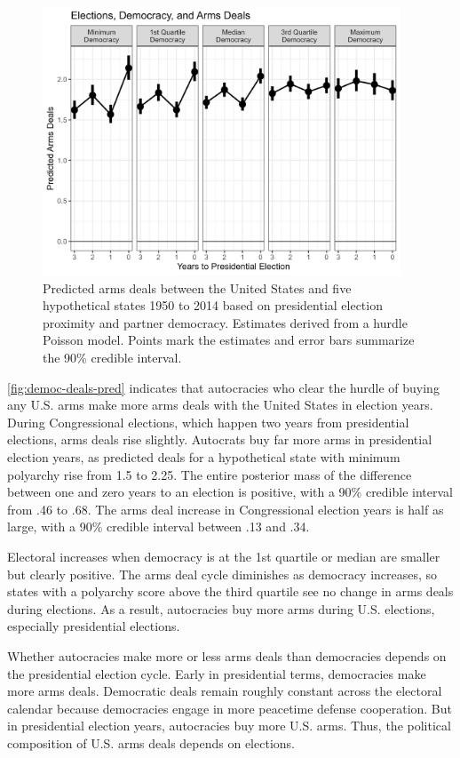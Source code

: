\documentclass[12pt]{article}
\begin{document}
\begin{figure}[htpb]
	\centering
		\includegraphics[width=0.95\textwidth]{../figures/democ-deals-pred.png}
	\caption{Predicted arms deals between the United States and five hypothetical states 1950 to 2014 based on presidential election proximity and partner democracy. Estimates derived from a hurdle Poisson model. Points mark the estimates and error bars summarize the 90\% credible interval.}
	\label{fig:democ-deals-pred}
\end{figure}


\autoref{fig:democ-deals-pred} indicates that autocracies who clear the hurdle of buying any U.S. arms make more arms deals with the United States in election years.
During Congressional elections, which happen two years from presidential elections, arms deals rise slightly. 
Autocrats buy far more arms in presidential election years, as predicted deals for a hypothetical state with minimum polyarchy rise from 1.5 to 2.25. 
The entire posterior mass of the difference between one and zero years to an election is positive, with a 90\% credible interval from .46 to .68.
The arms deal increase in Congressional election years is half as large, with a 90\% credible interval between .13 and .34. 


Electoral increases when democracy is at the 1st quartile or median are smaller but clearly positive.
The arms deal cycle diminishes as democracy increases, so states with a polyarchy score above the third quartile see no change in arms deals during elections.
As a result, autocracies buy more arms during U.S. elections, especially presidential elections.


Whether autocracies make more or less arms deals than democracies depends on the presidential election cycle. 
Early in presidential terms, democracies make more arms deals. 
Democratic deals remain roughly constant across the electoral calendar because democracies engage in more peacetime defense cooperation. 
But in presidential election years, autocracies buy more U.S. arms. 
Thus, the political composition of U.S. arms deals depends on elections. 
\end{document}

